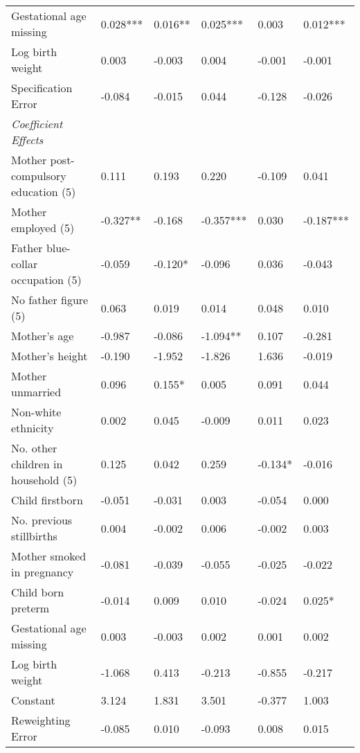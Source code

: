 \begin{table}[htbp]
\begin{tabular}{L{.3\textwidth}C{.085\textwidth}C{.085\textwidth}C{.085\textwidth}C{.085\textwidth}C{.085\textwidth}}
    Gestational age missing & 0.028*** & 0.016** & 0.025*** & 0.003 & 0.012*** \\
   Log birth weight & 0.003 & -0.003 & 0.004 & -0.001 & -0.001 \\
    Specification Error & -0.084 & -0.015 & 0.044 & -0.128 & -0.026 \\
    \textit{Coefficient Effects} &       &       &       &       &  \\
    Mother post-compulsory education (5) & 0.111 & 0.193 & 0.220 & -0.109 & 0.041 \\
    Mother employed (5) & -0.327** & -0.168 & -0.357*** & 0.030 & -0.187*** \\
    Father blue-collar occupation (5) & -0.059 & -0.120* & -0.096 & 0.036 & -0.043 \\
    No father figure (5) & 0.063 & 0.019 & 0.014 & 0.048 & 0.010 \\
    Mother's age & -0.987 & -0.086 & -1.094** & 0.107 & -0.281 \\
    Mother's height & -0.190 & -1.952 & -1.826 & 1.636 & -0.019 \\
    Mother unmarried & 0.096 & 0.155* & 0.005 & 0.091 & 0.044 \\
    Non-white ethnicity & 0.002 & 0.045 & -0.009 & 0.011 & 0.023 \\
    No. other children in household (5) & 0.125 & 0.042 & 0.259 & -0.134* & -0.016 \\
    Child firstborn & -0.051 & -0.031 & 0.003 & -0.054 & 0.000 \\
    No. previous stillbirths & 0.004 & -0.002 & 0.006 & -0.002 & 0.003 \\
    Mother smoked in pregnancy & -0.081 & -0.039 & -0.055 & -0.025 & -0.022 \\
    Child born preterm & -0.014 & 0.009 & 0.010 & -0.024 & 0.025* \\
    Gestational age missing & 0.003 & -0.003 & 0.002 & 0.001 & 0.002 \\
    Log birth weight & -1.068 & 0.413 & -0.213 & -0.855 & -0.217 \\
    Constant & 3.124 & 1.831 & 3.501 & -0.377 & 1.003 \\
    Reweighting Error & -0.085 & 0.010 & -0.093 & 0.008 & 0.015 \\
    \bottomrule
    \end{tabular}%
\endgroup
{}
\end{table}
